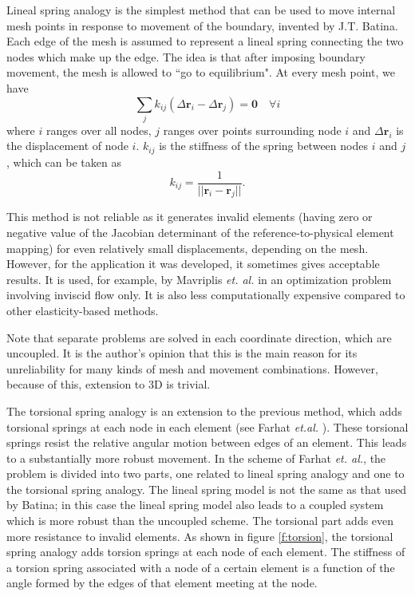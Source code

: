  Lineal spring analogy is the simplest method that can be used to move internal mesh points in response to movement of the boundary, invented by J.T. Batina. Each edge of the mesh is assumed to represent a lineal spring connecting the two nodes which make up the edge. The idea is that after imposing boundary movement, the mesh is allowed to ``go to equilibrium". At every mesh point, we have
 \begin{equation}
 \sum_j k_{ij}(\Delta \mathbf{r}_i - \Delta \mathbf{r}_j) = \mathbf{0} \quad \forall i
 \label{spring}
 \end{equation}
 where $i$ ranges over all nodes, $j$ ranges over points surrounding node $i$ and $\Delta \mathbf{r}_i$ is the displacement of node $i$.
 $k_{ij}$ is the stiffness of the spring between nodes $i$ and $j$, which can be taken as
 \begin{equation}
 k_{ij} = \frac{1}{||\mathbf{r}_i - \mathbf{r}_j||}.
 \end{equation}
 
 This method is not reliable as it generates invalid elements (having zero or negative value of the Jacobian determinant of the reference-to-physical element mapping) for even relatively small displacements, depending on the mesh. However, for the application it was developed, it sometimes gives acceptable results. It is used, for example, by Mavriplis \emph{et. al.} \cite{appl:mavriplis} in an optimization problem involving inviscid flow only. It is also less computationally expensive compared to other elasticity-based methods.
 
 Note that separate problems are solved in each coordinate direction, which are uncoupled. It is the author's opinion that this is the main reason for its unreliability for many kinds of mesh and movement combinations. However, because of this, extension to 3D is trivial.
 
 The torsional spring analogy is an extension to the previous method, which adds torsional springs at each node in each element (see Farhat \emph{et.al.} \cite{mm:torsionsprings}).
 These torsional springs resist the relative angular motion between edges of an element. This leads to a substantially more robust movement. In the scheme of Farhat \emph{et. al.}, the problem is divided into two parts, one related to lineal spring analogy and one to the torsional spring analogy. The lineal spring model is not the same as that used by Batina; in this case the lineal spring model also leads to a coupled system which is more robust than the uncoupled scheme. The torsional part adds even more resistance to invalid elements. As shown in figure \ref{f:torsion}, the torsional spring analogy adds torsion springs at each node of each element. The stiffness of a torsion spring associated with a node of a certain element is a function of the angle formed by the edges of that element meeting at the node.
 
